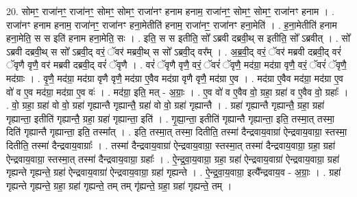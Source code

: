 \documentclass[17pt]{extarticle}
\begin{document}
20. सोमꣳ॒॒ राजा॑नꣳ॒॒ राजा॑नꣳ॒॒ सोमꣳ॒॒ सोमꣳ॒॒ राजा॑नꣳ हनाम हनाम॒ राजा॑नꣳ॒॒ सोमꣳ॒॒ सोमꣳ॒॒ राजा॑नꣳ हनाम । . राजा॑नꣳ हनाम हनाम॒ राजा॑नꣳ॒॒ राजा॑नꣳ हना॒मेतीति॑ हनाम॒ राजा॑नꣳ॒॒ राजा॑नꣳ हना॒मेति॑ । . ह॒ना॒मेतीति॑ हनाम हना॒मेति॒ स स इति॑ हनाम हना॒मेति॒ सः । . इति॒ स स इतीति॒ सो᳚ ऽब्रवी दब्रवी॒थ् स इतीति॒ सो᳚ ऽब्रवीत् । . सो᳚ ऽब्रवी दब्रवी॒थ् स सो᳚ ऽब्रवी॒द् वरं॒ ॅवर॑ मब्रवी॒थ् स सो᳚ ऽब्रवी॒द् वर᳚म् । . अ॒ब्र॒वी॒द् वरं॒ ॅवर॑ मब्रवी दब्रवी॒द् वरं॑ ॅवृणै वृणै॒ वर॑ मब्रवी दब्रवी॒द् वरं॑ ॅवृणै । . वरं॑ ॅवृणै वृणै॒ वरं॒ ॅवरं॑ ॅवृणै॒ मद॑ग्रा॒ मद॑ग्रा वृणै॒ वरं॒ ॅवरं॑ ॅवृणै॒ मद॑ग्राः । . वृ॒णै॒ मद॑ग्रा॒ मद॑ग्रा वृणै वृणै॒ मद॑ग्रा ए॒वैव मद॑ग्रा वृणै वृणै॒ मद॑ग्रा ए॒व । . मद॑ग्रा ए॒वैव मद॑ग्रा॒ मद॑ग्रा ए॒व वो॑ व ए॒व मद॑ग्रा॒ मद॑ग्रा ए॒व वः॑ । . मद॑ग्रा॒ इति॒ मत् - अ॒ग्राः॒ । . ए॒व वो॑ व ए॒वैव वो॒ ग्रहा॒ ग्रहा॑ व ए॒वैव वो॒ ग्रहाः᳚ । . वो॒ ग्रहा॒ ग्रहा॑ वो वो॒ ग्रहा॑ गृह्यान्तै गृह्यान्तै॒ ग्रहा॑ वो वो॒ ग्रहा॑ गृह्यान्तै । . ग्रहा॑ गृह्यान्तै गृह्यान्तै॒ ग्रहा॒ ग्रहा॑ गृह्यान्ता॒ इतीति॑ गृह्यान्तै॒ ग्रहा॒ ग्रहा॑ गृह्यान्ता॒ इति॑ । . गृ॒ह्या॒न्ता॒ इतीति॑ गृह्यान्तै गृह्यान्ता॒ इति॒ तस्मा॒त् तस्मा॒ दिति॑ गृह्यान्तै गृह्यान्ता॒ इति॒ तस्मा᳚त् । . इति॒ तस्मा॒त् तस्मा॒ दितीति॒ तस्मा॑ दैन्द्रवाय॒वाग्रा॑ ऐन्द्रवाय॒वाग्रा॒ स्तस्मा॒ दितीति॒ तस्मा॑ दैन्द्रवाय॒वाग्राः᳚ । . तस्मा॑ दैन्द्रवाय॒वाग्रा॑ ऐन्द्रवाय॒वाग्रा॒ स्तस्मा॒त् तस्मा॑ दैन्द्रवाय॒वाग्रा॒ ग्रहा॒ ग्रहा॑ ऐन्द्रवाय॒वाग्रा॒ स्तस्मा॒त् तस्मा॑ दैन्द्रवाय॒वाग्रा॒ ग्रहाः᳚ । . ऐ॒न्द्र॒वा॒य॒वाग्रा॒ ग्रहा॒ ग्रहा॑ ऐन्द्रवाय॒वाग्रा॑ ऐन्द्रवाय॒वाग्रा॒ ग्रहा॑ गृह्यन्ते गृह्यन्ते॒ ग्रहा॑ ऐन्द्रवाय॒वाग्रा॑ ऐन्द्रवाय॒वाग्रा॒ ग्रहा॑ गृह्यन्ते । . ऐ॒न्द्र॒वा॒य॒वाग्रा॒ इत्यै᳚न्द्रवाय॒व - अ॒ग्राः॒ । . ग्रहा॑ गृह्यन्ते गृह्यन्ते॒ ग्रहा॒ ग्रहा॑ गृह्यन्ते॒ तम् तम् गृ॑ह्यन्ते॒ ग्रहा॒ ग्रहा॑ गृह्यन्ते॒ तम् । \newline
\end{document}
